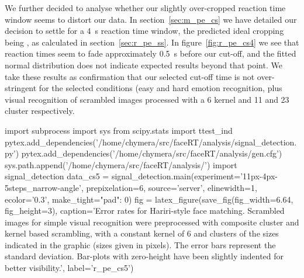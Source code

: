 	    We further decided to analyse whether our slightly over-cropped reaction time window seems to distort our data.
	    In section~\ref{sec:m_pe_cs} we have detailed our decision to settle for a \SI{4}{\second} reaction time window, the predicted ideal cropping being , as calculated in section~\ref{sec:r_pe_ss}.
	    In figure~\ref{fig:r_pe_cs4} we see that reaction times seem to fade approximately \SI{0.5}{\second} before our cut-off, and the fitted normal distribution does not indicate expected results beyond that point.
	    We take these results as confirmation that our selected cut-off time is not over-stringent for the selected conditions (easy and hard emotion recognition, plus visual recognition of scrambled images processed with a \SI{6}{\pixel} kernel and \SI{11}{\pixel} and \SI{23}{\pixel} cluster respectively.	    
	    \begin{pycode}
		import subprocess
		import sys
		from scipy.stats import ttest_ind
		pytex.add_dependencies('/home/chymera/src/faceRT/analysis/signal_detection.py')
		pytex.add_dependencies('/home/chymera/src/faceRT/analysis/gen.cfg')
		sys.path.append('/home/chymera/src/faceRT/analysis/')
		import signal_detection
		data_cs5 = signal_detection.main(experiment='11px-4px-5steps_narrow-angle', prepixelation=6, source='server', elinewidth=1, ecolor='0.3', make_tight={"pad": 0})
		fig = latex_figure(save_fig(fig_width=6.64, fig_height=3), caption='Error rates for Hariri-style face matching. Scrambled images for simple visual recognition were preprocessed with composite cluster and kernel based scrambling, with a constant kernel of \SI{6}{\pixel} and clusters of the sizes indicated in the graphic (sizes given in pixels). The error bars represent the standard deviation. Bar-plots with zero-height have been slightly indented for better visibility.', label='r_pe_cs5')
	    \end{pycode}
	    
